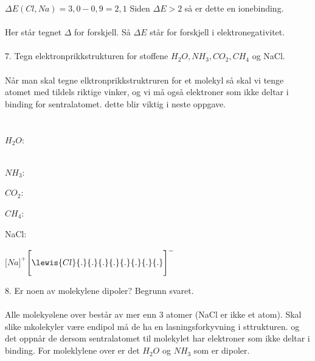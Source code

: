 \documentclass[12pt,a4paper]{article}
\begin{document}
$\Delta E(Cl,Na)=3,0-0,9=2,1$ Siden $\Delta E>2$ så er dette en ionebinding.\\\\
Her står tegnet $\Delta$ for forskjell. Så $\Delta E$ står for forskjell i elektronegativitet.
\\\\
7.	Tegn elektronprikkstrukturen for stoffene $H_2O, NH_3, CO_2, CH_4$ og NaCl.\\\\ 
Når man skal tegne elktronprikkstruktruren for et molekyl så skal vi tenge atomet med tildels riktige vinker, og vi må også elektroner som ikke deltar i binding for sentralatomet.  dette blir viktig i neste oppgave.\\\\\\
$H_2O$:\\\\
\begin{center}
\end{center}\vspace{1cm}
$NH_3$:
\begin{center}
\end{center}\newpage
$CO_2$:
\begin{center}
\end{center}\vspace{1cm}
$CH_4$:
\begin{center}
\end{center}\vspace{1cm}
NaCl:
\begin{center}
    $\Biggr[Na \Biggr]^+$$\Biggr[\lewis{Cl}{.}{.}{.}{.}{.}{.}{.}{.} \Biggr]^-$
\end{center}\vspace{1cm}
8.	Er noen av molekylene dipoler? Begrunn svaret.\\\\
Alle molekyølene over består av mer enn 3 atomer (NaCl er ikke et atom).  Skal slike mkolekyler være endipol må de ha en lasningsforkyvning i sttrukturen.  og det oppnår de dersom sentralatomet til molekylet har elektroner som ikke deltar i binding. For moleklylene over er det $H_2O$ og $NH_3$ som er dipoler.  
\end{document}

